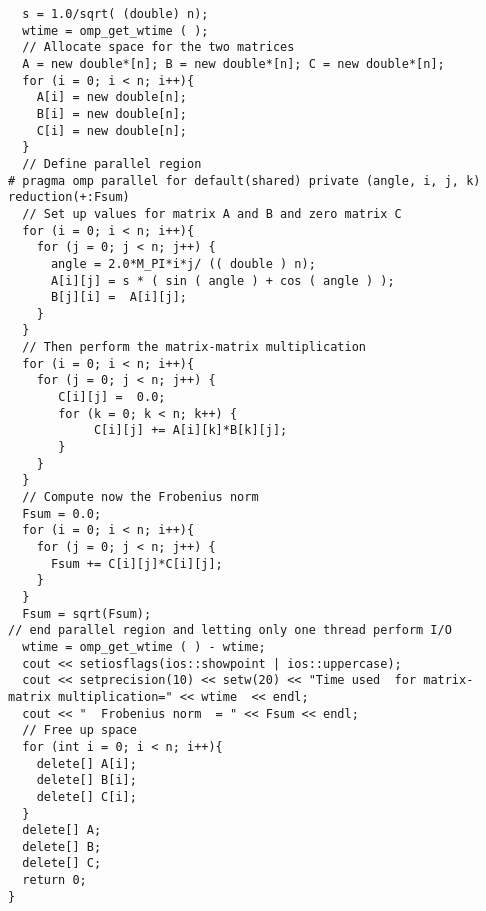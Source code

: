 \documentclass{beamer}
\begin{document}
\begin{frame}
\begin{verbatim}
  s = 1.0/sqrt( (double) n);
  wtime = omp_get_wtime ( );
  // Allocate space for the two matrices
  A = new double*[n]; B = new double*[n]; C = new double*[n];
  for (i = 0; i < n; i++){
    A[i] = new double[n];
    B[i] = new double[n];
    C[i] = new double[n];
  }
  // Define parallel region
# pragma omp parallel for default(shared) private (angle, i, j, k) reduction(+:Fsum)
  // Set up values for matrix A and B and zero matrix C
  for (i = 0; i < n; i++){
    for (j = 0; j < n; j++) {
      angle = 2.0*M_PI*i*j/ (( double ) n);
      A[i][j] = s * ( sin ( angle ) + cos ( angle ) );
      B[j][i] =  A[i][j];
    }
  }
  // Then perform the matrix-matrix multiplication
  for (i = 0; i < n; i++){
    for (j = 0; j < n; j++) {
       C[i][j] =  0.0;    
       for (k = 0; k < n; k++) {
            C[i][j] += A[i][k]*B[k][j];
       }
    }
  }
  // Compute now the Frobenius norm
  Fsum = 0.0;
  for (i = 0; i < n; i++){
    for (j = 0; j < n; j++) {
      Fsum += C[i][j]*C[i][j];
    }
  }
  Fsum = sqrt(Fsum);
// end parallel region and letting only one thread perform I/O
  wtime = omp_get_wtime ( ) - wtime;
  cout << setiosflags(ios::showpoint | ios::uppercase);
  cout << setprecision(10) << setw(20) << "Time used  for matrix-matrix multiplication=" << wtime  << endl;
  cout << "  Frobenius norm  = " << Fsum << endl;
  // Free up space
  for (int i = 0; i < n; i++){
    delete[] A[i];
    delete[] B[i];
    delete[] C[i];
  }
  delete[] A;
  delete[] B;
  delete[] C;
  return 0;
}



\end{verbatim}
\end{frame}
\end{document}
